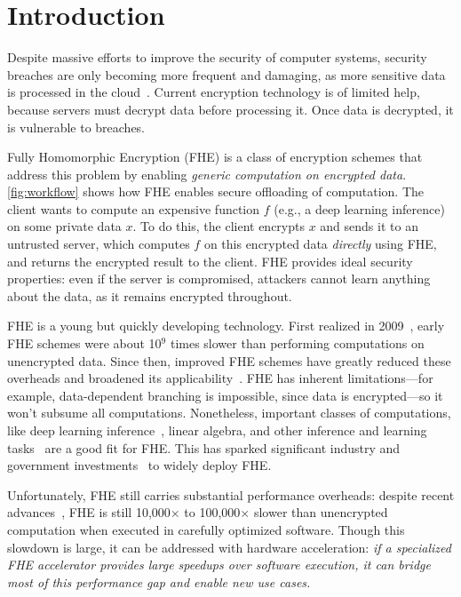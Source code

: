 \chapter{Introduction}\label{sec:intro}

Despite massive efforts to improve the security of computer systems, security
breaches are only becoming more frequent and damaging, as more sensitive data
is processed in the
cloud~\cite{malekos-smith:csis20:hidden-costs-cybercrime,ibm20:breach-cost-report}.
Current encryption technology is of limited help, because servers must decrypt
data before processing it. Once data is decrypted, it is vulnerable to
breaches.

\figWorkflow

Fully Homomorphic Encryption (FHE) is a class of encryption schemes that
address this problem by enabling \emph{generic computation on encrypted data}.
\autoref{fig:workflow} shows how FHE enables secure offloading of computation.
The client wants to compute an expensive function $f$ (e.g., a deep learning
inference) on some private data $x$. To do this, the client encrypts $x$ and
sends it to an untrusted server, which computes $f$ on this encrypted data
\emph{directly} using FHE, and returns the encrypted result to the client. FHE
provides ideal security properties: even if the server is compromised,
attackers cannot learn anything about the data, as it remains encrypted
throughout.


FHE is a young but quickly developing technology. First realized in
2009~\cite{gentry09}, early FHE schemes were about 10$^9$ times slower than
performing computations on unencrypted data. Since then, improved FHE schemes
have greatly reduced these overheads and broadened its
applicability~\cite{albrecht:hesg18:standard,peikert2016decade}. FHE has
inherent limitations---for example, data-dependent branching is impossible,
since data is encrypted---so it won't subsume all computations. Nonetheless,
important classes of computations, like deep learning
inference~\cite{cheon:ictaci17:homomorphic,dathathri:pldi19:chet,dathathri:pldi20:eva},
linear algebra, and other inference and learning
tasks~\cite{han:aaai19:logistic} are a good fit for FHE. This has sparked
significant industry and government investments~\cite{ibm,intel,dprive} to
widely deploy FHE.

Unfortunately, FHE still carries substantial performance overheads: despite
recent advances~\cite{dathathri:pldi19:chet, dathathri:pldi20:eva,
roy:hpca19:fpga-he, brutzkus:icml19:low, polyakov:17:palisade}, FHE is still
10,000$\times$ to 100,000$\times$ slower than unencrypted computation when
executed in carefully optimized software. Though this slowdown is large, it can
be addressed with hardware acceleration: \emph{if a specialized FHE accelerator
provides large speedups over software execution, it can bridge most of this
performance gap and enable new use cases.}

